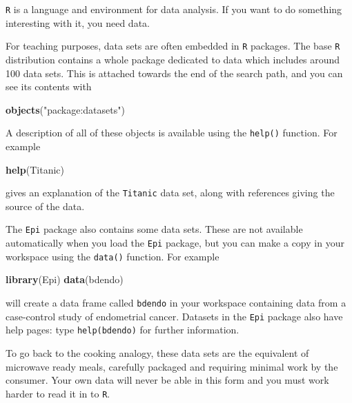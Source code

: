 \documentclass[
]{book}
\newenvironment{Shaded}{\begin{snugshade}}{\end{snugshade}}
\newcommand{\FunctionTok}[1]{\textcolor[rgb]{0.13,0.29,0.53}{\textbf{#1}}}
\newcommand{\NormalTok}[1]{#1}
\newcommand{\StringTok}[1]{\textcolor[rgb]{0.31,0.60,0.02}{#1}}
\begin{document}
\texttt{R} is a language and environment for data analysis. If you
want to do something interesting with it, you need data.

For teaching purposes, data sets are often embedded in \texttt{R}
packages. The base \texttt{R} distribution contains a whole package
dedicated to data which includes around 100 data sets. This is
attached towards the end of the search path, and you can see its
contents with

\begin{Shaded}
\begin{Highlighting}[]
\FunctionTok{objects}\NormalTok{(}\StringTok{"package:datasets"}\NormalTok{)}
\end{Highlighting}
\end{Shaded}

A description of all of these objects is available using the \texttt{help()}
function. For example

\begin{Shaded}
\begin{Highlighting}[]
\FunctionTok{help}\NormalTok{(Titanic)}
\end{Highlighting}
\end{Shaded}

gives an explanation of the \texttt{Titanic} data set, along with
references giving the source of the data.

The \texttt{Epi} package also contains some data sets. These are not
available automatically when you load the \texttt{Epi} package, but
you can make a copy in your workspace using the \texttt{data()}
function. For example

\begin{Shaded}
\begin{Highlighting}[]
\FunctionTok{library}\NormalTok{(Epi)}
\FunctionTok{data}\NormalTok{(bdendo)}
\end{Highlighting}
\end{Shaded}

will create a data frame called \texttt{bdendo} in your workspace
containing data from a case-control study of endometrial cancer.
Datasets in the \texttt{Epi} package also have help pages: type
\texttt{help(bdendo)} for further information.

To go back to the cooking analogy, these data sets are the equivalent
of microwave ready meals, carefully packaged and requiring minimal
work by the consumer. Your own data will never be able in this form
and you must work harder to read it in to \texttt{R}.
\end{document}
